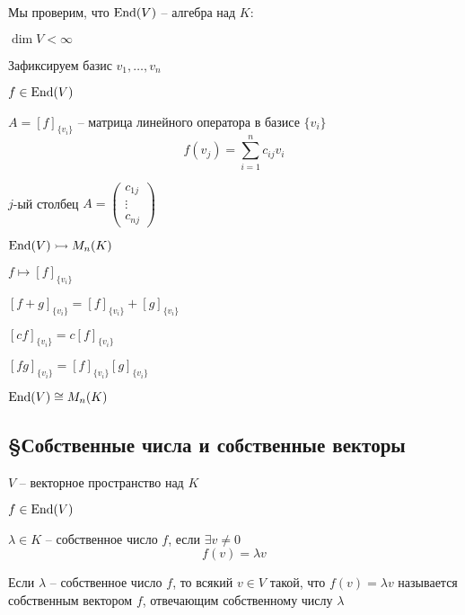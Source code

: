     \par $ $
    \par Мы проверим, что $\operatorname{End}(V)$ -- алгебра над $K$:
    \par \quad $\dim V < \infty$
    \par \quad Зафиксируем базис $v_1, \dots, v_n$
    \par \quad $f \in \operatorname{End}(V)$
    \par \quad $A = [f]_{\{v_i\}}$ -- матрица линейного оператора в базисе $\{v_i\}$
    \[
        f(v_j) = \sum_{i=1}^n c_{ij} v_i    
    \]
    \par \quad $j$-ый столбец $A = \begin{pmatrix}
        c_{1j} \\
        \vdots \\
        c_{nj}
    \end{pmatrix}$

    \par $\operatorname{End}(V) \rightarrowtail M_n(K)$ %
    \par \quad $f \mapsto [f]_{\{v_i\}}$
    \par \quad $[f+g]_{\{v_i\}} = [f]_{\{v_i\}} + [g]_{\{v_i\}}$
    \par \quad $[cf]_{\{v_i\}} = c[f]_{\{v_i\}}$
    \par \quad $[fg]_{\{v_i\}} = [f]_{\{v_i\}}[g]_{\{v_i\}}$
    \par $\operatorname{End}(V) \cong M_n(K)$

    \subsection*{\S Собственные числа и собственные векторы}

    \par $V$ -- векторное пространство над $K$
    \par $f \in \operatorname{End}(V)$

    \begin{definition}
        $\lambda \in K$ -- собственное число $f$, если $\exists v \not = 0$
        \[
            f(v) = \lambda v    
        \]
        \par Если $\lambda$ -- собственное число $f$, то всякий $v \in V$ такой, что $f(v) = \lambda v$ называется
        собственным вектором $f$, отвечающим собственному числу $\lambda$
    \end{definition}

